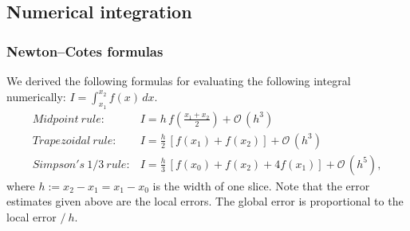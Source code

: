 \subsection{Numerical integration}
\label{ssec:integr}

\subsubsection{Newton–Cotes formulas}
\label{sec:int_newton_cotes}

We derived the following formulas for evaluating the following integral numerically: $I = \int_{x_1}^{x_2} f(x) \, dx.$
\begin{eqnarray}
\mathit{Midpoint~rule:} & I = h \, f(\frac{x_1+x_2}{2})  + \mathcal{O}\,(h^3) \\
\mathit{Trapezoidal~rule:} & I = \frac{h}{2} \,\left[ f(x_1) + f(x_2) \right]  + \mathcal{O}\,(h^3) \\
\mathit{Simpson's~1/3~rule:} & I = \frac{h}{3} \,\left[ f(x_0) + f(x_2) + 4 f(x_1) \right]  + \mathcal{O}\,(h^5), 
\end{eqnarray}
where $h := x_2 - x_1 = x_1 - x_0$ is the width of one slice. Note that the error estimates given above are the local errors. The global error is proportional to the local error $/~h$. 

